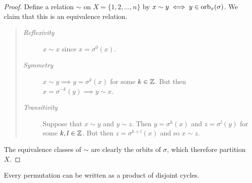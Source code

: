 \begin{proof}
Define a relation $\sim$ on $X=\{1,2,\ldots,n\}$ by $x\sim y\iff y\in\mathrm{orb}_x(\sigma)$. We claim that this is an equivalence relation.\footnotemark
\begin{quote}
\begin{description}
	\item[\normalfont\emph{Reflexivity}] $x\sim x$ since $x=\sigma^0(x)$. \checkmark
	\item[\normalfont\emph{Symmetry}] $x\sim y\implies y=\sigma^k(x)$ for some $k\in\mathbb{Z}$. But then $x=\sigma^{-k}(y) \implies y\sim x$. \checkmark
	\item[\normalfont\emph{Transitivity}] Suppose that $x\sim y$ and $y\sim z$. Then $y=\sigma^k(x)$ and $z=\sigma^l(y)$ for some $k,l\in\mathbb{Z}$. But then $z=\sigma^{k+l}(x)$ and so $x\sim z$. \checkmark
\end{description}
\end{quote}
The equivalence classes of $\sim$ are clearly the orbits of $\sigma$, which therefore partition $X$.
\end{proof}


\goodbreak

\begin{thm}{}{}
Every permutation can be written as a product of disjoint cycles.
\end{thm}

